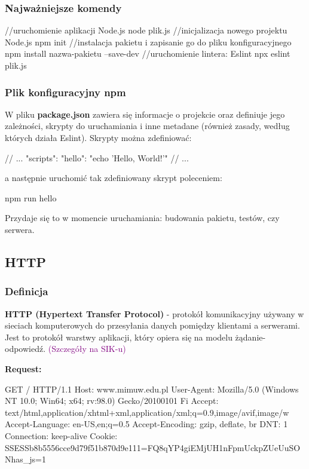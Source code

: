 \subsubsection{Najważniejsze komendy}
    \begin{java}
//uruchomienie aplikacji Node.js
node plik.js
//inicjalizacja nowego projektu Node.js
npm init 
//instalacja pakietu i zapisanie go do pliku konfiguracyjnego
npm install nazwa-pakietu --save-dev 
//uruchomienie lintera: Eslint
npx eslint plik.js
    \end{java}

\subsubsection{Plik konfiguracyjny npm}

W pliku \textbf{package.json} zawiera się informacje o projekcie oraz definiuje jego zależności, skrypty do uruchamiania i inne metadane (również zasady, według których działa Eslint).
Skrypty można zdefiniować:

\begin{java}
{
    // ...
    "scripts": {
        "hello": "echo 'Hello, World!'"
    }
    // ...
}
\end{java}

a następnie uruchomić tak zdefiniowany skrypt poleceniem:

\begin{java}
    npm run hello
\end{java}

Przydaje się to w momencie uruchamiania: budowania pakietu, testów, czy serwera.

\subsection{HTTP}
\subsubsection{Definicja}
\textbf{HTTP (Hypertext Transfer Protocol)} - protokół komunikacyjny używany w sieciach komputerowych do przesyłania danych pomiędzy klientami a serwerami. Jest to protokół warstwy aplikacji, który opiera się na modelu żądanie-odpowiedź. \textcolor{purple}{(Szczegóły na SIK-u)}

\begin{example}
    \textbf{Request:}
    \begin{java}
GET / HTTP/1.1
Host: www.mimuw.edu.pl
User-Agent: Mozilla/5.0 (Windows NT 10.0; Win64; x64; rv:98.0) Gecko/20100101 Fi
Accept: text/html,application/xhtml+xml,application/xml;q=0.9,image/avif,image/w
Accept-Language: en-US,en;q=0.5
Accept-Encoding: gzip, deflate, br
DNT: 1
Connection: keep-alive
Cookie: SSESSb8b5556cce9d79f51b870d9e111=FQ8qYP4giEMjUH1nFpmUckpZUeUuSONhas_js=1
    \end{java}
\end{example}


